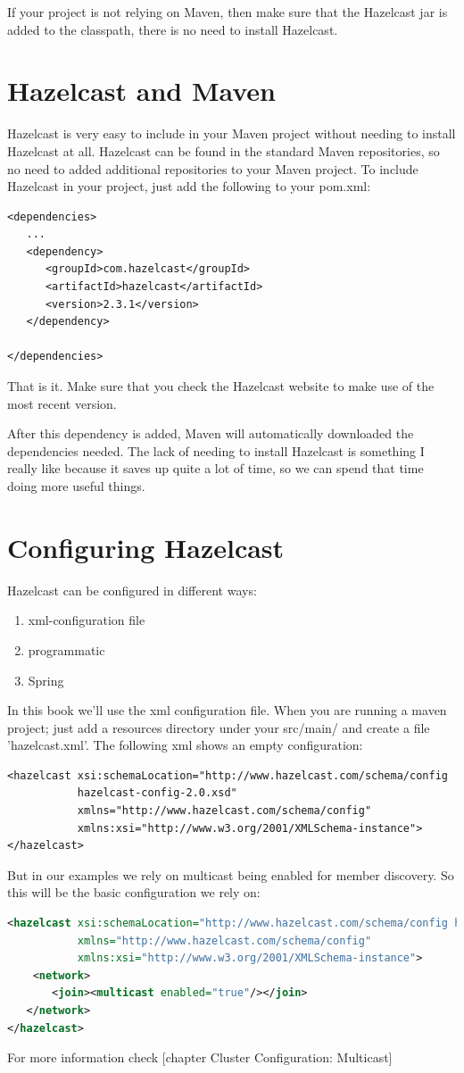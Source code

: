 If your project is not relying on Maven, then make sure that the Hazelcast jar is added to the classpath, there is no need to install Hazelcast.

\section{Hazelcast and Maven}
Hazelcast is very easy to include in your Maven project without needing to install Hazelcast at all. Hazelcast can be found in the standard Maven repositories, so no need to added additional repositories to your Maven project. To include Hazelcast in your project, just add the following to your pom.xml:
\begin{verbatim}
<dependencies>	
   ...
   <dependency>
      <groupId>com.hazelcast</groupId>
      <artifactId>hazelcast</artifactId>
      <version>2.3.1</version>
   </dependency>

</dependencies>
\end{verbatim}	
That is it. Make sure that you check the Hazelcast website to make use of the most recent version. 

After this dependency is added, Maven will automatically downloaded the dependencies needed.  The lack of needing to install Hazelcast is something I really like because it saves up quite a lot of time, so we can spend that time doing more useful things.

\section{Configuring Hazelcast}
Hazelcast can be configured in different ways:
\begin{enumerate}
\item xml-configuration file
\item programmatic 
\item Spring
\end{enumerate}
In this book we'll use the xml configuration file. When you are running a maven project; just add a resources directory under your src/main/ and create a file 'hazelcast.xml'. The following xml shows an empty configuration:
\begin{verbatim}
<hazelcast xsi:schemaLocation="http://www.hazelcast.com/schema/config
           hazelcast-config-2.0.xsd"
           xmlns="http://www.hazelcast.com/schema/config"
           xmlns:xsi="http://www.w3.org/2001/XMLSchema-instance">
</hazelcast>
\end{verbatim}
But in our examples we rely on multicast being enabled for member discovery. So this will be the basic configuration we rely on:
\begin{lstlisting}[language=xml]
<hazelcast xsi:schemaLocation="http://www.hazelcast.com/schema/config hazelcast-config-2.3.xsd"
           xmlns="http://www.hazelcast.com/schema/config"
           xmlns:xsi="http://www.w3.org/2001/XMLSchema-instance">
    <network>
       <join><multicast enabled="true"/></join>
   </network>
</hazelcast>
\end{lstlisting}
For more information check [chapter Cluster Configuration: Multicast]

